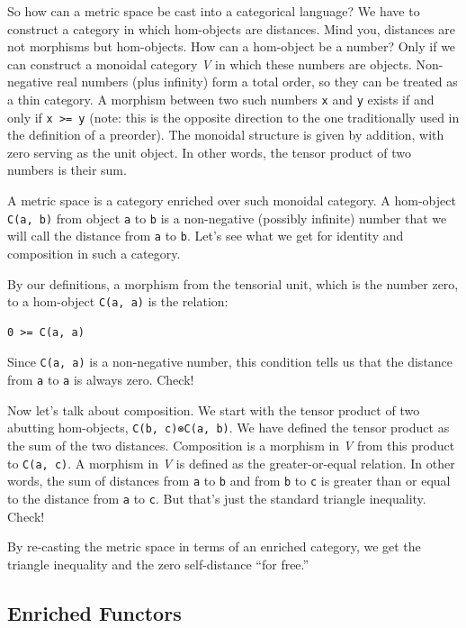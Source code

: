 So how can a metric space be cast into a categorical language? We have
to construct a category in which hom-objects are distances. Mind you,
distances are not morphisms but hom-objects. How can a hom-object be a
number? Only if we can construct a monoidal category \emph{V} in which
these numbers are objects. Non-negative real numbers (plus infinity)
form a total order, so they can be treated as a thin category. A
morphism between two such numbers \texttt{x} and \texttt{y} exists if
and only if \texttt{x\ \textgreater{}=\ y} (note: this is the opposite
direction to the one traditionally used in the definition of a
preorder). The monoidal structure is given by addition, with zero
serving as the unit object. In other words, the tensor product of two
numbers is their sum.

A metric space is a category enriched over such monoidal category. A
hom-object \texttt{C(a,\ b)} from object \texttt{a} to \texttt{b} is a
non-negative (possibly infinite) number that we will call the distance
from \texttt{a} to \texttt{b}. Let's see what we get for identity and
composition in such a category.

By our definitions, a morphism from the tensorial unit, which is the
number zero, to a hom-object \texttt{C(a,\ a)} is the relation:

\begin{verbatim}
0 >= C(a, a)
\end{verbatim}

Since \texttt{C(a,\ a)} is a non-negative number, this condition tells
us that the distance from \texttt{a} to \texttt{a} is always zero.
Check!

Now let's talk about composition. We start with the tensor product of
two abutting hom-objects, \texttt{C(b,\ c)⊗C(a,\ b)}. We have defined
the tensor product as the sum of the two distances. Composition is a
morphism in \emph{V} from this product to \texttt{C(a,\ c)}. A morphism
in \emph{V} is defined as the greater-or-equal relation. In other words,
the sum of distances from \texttt{a} to \texttt{b} and from \texttt{b}
to \texttt{c} is greater than or equal to the distance from \texttt{a}
to \texttt{c}. But that's just the standard triangle inequality. Check!

By re-casting the metric space in terms of an enriched category, we get
the triangle inequality and the zero self-distance ``for free.''

\subsection{Enriched Functors}\label{enriched-functors}

